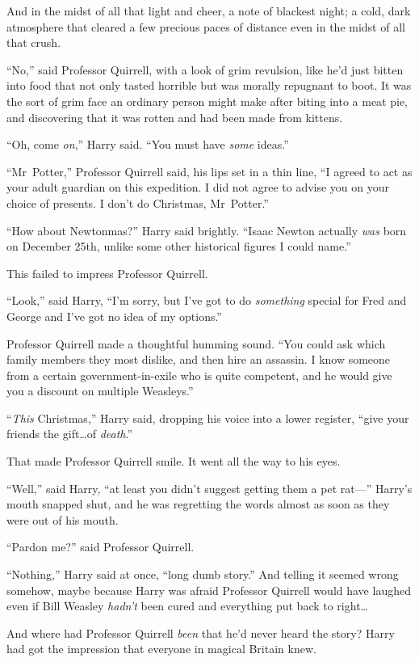 And in the midst of all that light and cheer, a note of blackest night; a cold, dark atmosphere that cleared a few precious paces of distance even in the midst of all that crush.

“No,” said Professor Quirrell, with a look of grim revulsion, like he’d just bitten into food that not only tasted horrible but was morally repugnant to boot. It was the sort of grim face an ordinary person might make after biting into a meat pie, and discovering that it was rotten and had been made from kittens.

“Oh, come \emph{on},” Harry said.
“You must have \emph{some} ideas.”

“Mr~Potter,” Professor Quirrell said, his lips set in a thin line,
“I agreed to act as your adult guardian on this expedition. I did not agree to advise you on your choice of presents. I don’t do Christmas, Mr~Potter.”

“How about Newtonmas?” Harry said brightly.
“Isaac Newton actually \emph{was} born on December 25th, unlike some other historical figures I could name.”

This failed to impress Professor Quirrell.

“Look,” said Harry,
“I’m sorry, but I’ve got to do \emph{something} special for Fred and George and I’ve got no idea of my options.”

Professor Quirrell made a thoughtful humming sound.
“You could ask which family members they most dislike, and then hire an assassin. I know someone from a certain government-in-exile who is quite competent, and he would give you a discount on multiple Weasleys.”

“\emph{This} Christmas,” Harry said, dropping his voice into a lower register, “give your friends the gift…of \emph{death}.”

That made Professor Quirrell smile. It went all the way to his eyes.

“Well,” said Harry, “at least you didn’t suggest getting them a pet rat—” Harry’s mouth snapped shut, and he was regretting the words almost as soon as they were out of his mouth.

“Pardon me?” said Professor Quirrell.

“Nothing,” Harry said at once, “long dumb story.” And telling it seemed wrong somehow, maybe because Harry was afraid Professor Quirrell would have laughed even if Bill Weasley \emph{hadn’t} been cured and everything put back to right…

And where had Professor Quirrell \emph{been} that he’d never heard the story? Harry had got the impression that everyone in magical Britain knew.

